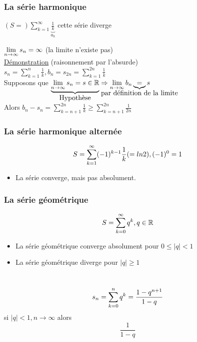 \documentclass[12pt,a4paper]{article}
\begin{document}
{\subsubsection{La série harmonique}
\begin{boite}[0.5]
$(S=) \sum^\infty_{k=1} \underbrace{\frac{1}{k}}_{a_k}$ cette série diverge
\end{boite}
$\limite{\ninf} s_n = \infty$ (la limite n'existe pas)\\
\underline{Démonstration} (raisonnement par l'absurde)\\
$s_n = \sum^n_{k=1} \frac{1}{k}, b_n = s_{2n} = \sum^{2n}_{k=1} \frac{1}{k}$\\
Supposons que $\underbrace{\limite{\ninf} s_n = s \in  \R}_{\mbox{Hypothèse}} \Rightarrow \limite{\ninf} b_n \underbrace{=}_{\mathclap{\mbox{par définition de la limite}}} s$\\
Alors $b_n-s_n = \sum^{2n}_{k = n+1} \frac{1}{k} \geq \sum^{2n}_{k=n+1} \frac{1}{2n}$
\subsubsection{La série harmonique alternée}
\begin{equation}
S= \somme{\infty}{k=1}(-1)^{k-1}\frac{1}{k} (=ln 2), (-1)^0 = 1
\end{equation}
\begin{itemize}
	\item La série converge, mais pas absolument.
\end{itemize}
\subsubsection{La série géométrique}
\begin{equation}
S = \somme{\infty}{k=0}q^k, q \in \R
\end{equation}
\begin{itemize}
	\item La série géométrique converge absolument pour $0 \leq |q| < 1$
	\item La série géométrique diverge pour $|q| \geq 1$
\end{itemize}
\\
\begin{equation}
s_n = \somme{n}{k=0}q^k = \frac{1-q^{n+1}}{1-q}	
\end{equation}
si $|q| < 1, n \to \infty$ alors
\begin{equation}
\frac{1}{1-q}
\end{equation}
}
\end{document}
